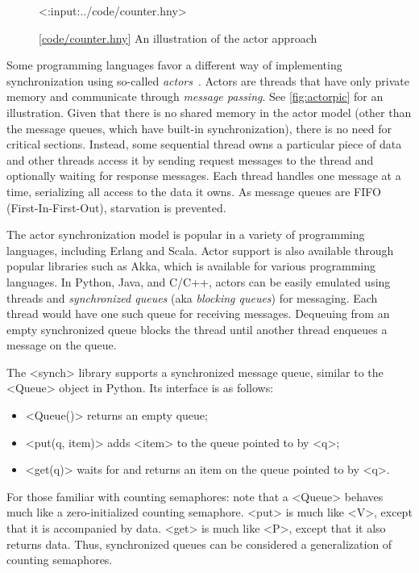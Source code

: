 \documentclass{report}
\newcommand{\harmonylink}[1]{%
[\href{https://harmony.cs.cornell.edu/#1}{\underline{#1}}]%
}
\newenvironment{code}{
\tcolorbox
}{
\endtcolorbox
}
\begin{document}
\begin{figure}
\begin{code}
<{:input:../code/counter.hny}>
\end{code}
\caption{\harmonylink{code/counter.hny} An illustration of the actor approach}
\label{fig:actor}
\end{figure}

Some programming languages favor a different way of implementing
synchronization using so-called \emph{actors}~\cite{HBS73,Agha86}.  Actors are
threads that have only private memory and communicate through
\emph{message passing}.
See \autoref{fig:actorpic} for an illustration.
Given that there is no shared memory in the actor model (other than the message
queues, which have built-in synchronization), there is no need
for critical sections.  Instead, some sequential thread owns a particular
piece of data and other threads access it by sending request messages
to the thread and optionally waiting for response messages.  Each thread
handles one message at a time, serializing all access to the data it owns.
As message queues are FIFO (First-In-First-Out), starvation is prevented.

The actor synchronization model is popular in a variety of programming
languages, including Erlang and Scala.  Actor support is also available
through popular libraries such as Akka, which is available for various
programming languages.  In Python, Java, and C/C++,
actors can be easily emulated using threads and \emph{synchronized queues}
%
(aka \emph{blocking queues})
%
for messaging.
Each thread would have one such queue for receiving messages.
Dequeuing from an empty synchronized queue blocks the thread until
another thread enqueues a message on the queue.

The <{synch}> library supports a synchronized message queue,
similar to the <{Queue}> object in Python.
Its interface is as follows:
\begin{itemize}
\item <{Queue()}> returns an empty queue;
\item <{put(q, item)}> adds <{item}> to the queue pointed to by <{q}>;
\item <{get(q)}> waits for and returns an item on the queue pointed to by <{q}>.
\end{itemize}

For those familiar with counting semaphores: note that a <{Queue}>
behaves much like a zero-initialized counting semaphore.
<{put}> is much like <{V}>, except that it is accompanied by data.
<{get}> is much like <{P}>, except that it also returns data.
Thus, synchronized queues can be considered a generalization of
counting semaphores.
\end{document}
